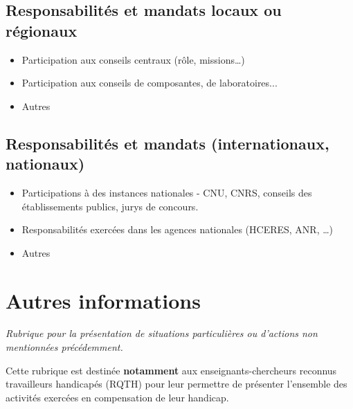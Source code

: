\documentclass[a4paper,12pt]{article}
\newcommand{\ligneSeparatrice}{\noindent{\color{black!40}\rule{\textwidth}{2pt}}}
\newcommand{\instructions}[1]{{\color{black}#1}}
\begin{document}
\subsection{Responsabilités et mandats locaux ou régionaux}


\instructions{%
	{\em
	\begin{itemize}
		\item Participation aux conseils centraux (rôle, missions…)
		\item Participation aux conseils de composantes, de laboratoires...
    	\item Autres
	\end{itemize}

	}
}


\subsection{Responsabilités et mandats (internationaux, nationaux)}


\instructions{%
	{\em
	\begin{itemize}
		\item Participations à des instances nationales - CNU, CNRS, conseils des établissements publics, jurys de concours.
		\item Responsabilités exercées dans les agences nationales (HCERES, ANR, …)
    	\item Autres
	\end{itemize}

	}
}


\ligneSeparatrice{}


\section{Autres informations}

\instructions{%
	{\em
		Rubrique pour la présentation de situations particulières ou d'actions non mentionnées précédemment.

		\bigskip

		Cette rubrique est destinée \textbf{notamment} aux enseignants-chercheurs reconnus travailleurs handicapés (RQTH) pour leur permettre de présenter l'ensemble des activités exercées en compensation de leur handicap.

	}
}
\end{document}

